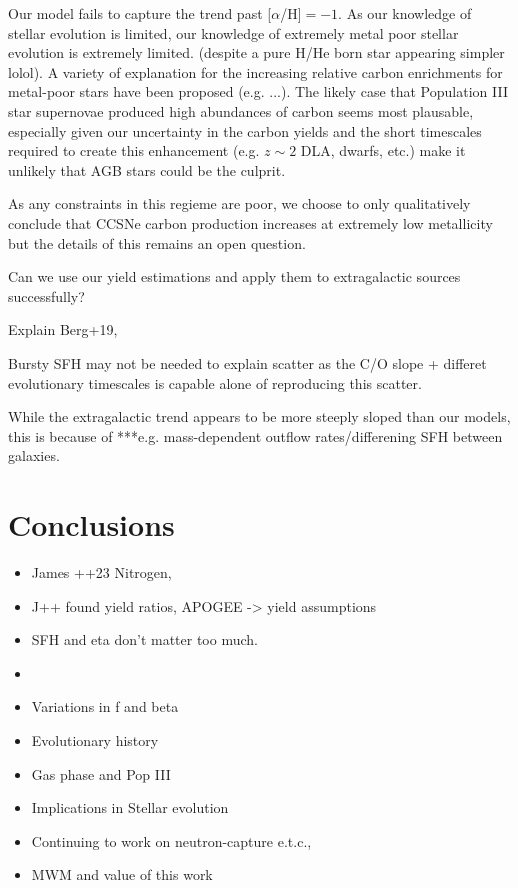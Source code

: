 \documentclass[12pt,oneside]{report}
\begin{document}
Our model fails to capture the trend past [$\alpha$/H]$=-1$. As our knowledge
of stellar evolution is limited, our knowledge of extremely metal poor stellar
evolution is extremely limited. (despite a pure H/He born star appearing
simpler lolol). A variety of explanation for the increasing relative carbon
enrichments for metal-poor stars have been proposed (e.g. ...). The likely case
that Population III star supernovae produced high abundances of carbon seems
most plausable, especially given our uncertainty in the carbon yields and the
short timescales required to create this enhancement (e.g. $z\sim 2$ DLA,
dwarfs, etc.) make it unlikely that AGB stars could be the culprit. 

As any constraints in this regieme are poor, we choose to only qualitatively
conclude that CCSNe carbon production increases at extremely low metallicity
but the details of this remains an open question.


Can we use our yield estimations and apply them to extragalactic sources successfully? 

Explain Berg+19,

Bursty SFH may not be needed to explain scatter as the C/O slope + differet evolutionary timescales is capable alone of reproducing this scatter.

While the extragalactic trend appears to be more steeply sloped than our models, this is because of ***e.g. mass-dependent outflow rates/differening SFH between galaxies. 


\chapter{Conclusions}

\begin{itemize}
    \item James ++23 Nitrogen,
    \item J++ found yield ratios, APOGEE -> yield assumptions
    \item SFH and eta don't matter too much.

        \item
        \item Variations in f and beta
        \item Evolutionary history
        \item Gas phase and Pop III
        \item Implications in Stellar evolution
        \item Continuing to work on neutron-capture e.t.c., 
        \item MWM and value of this work
\end{itemize}
\end{document}

